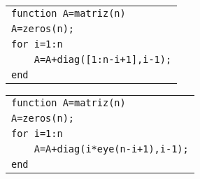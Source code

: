 \begin{pregunta}
\begin{multicols}{2}
\begin{alternativas}
{\begin{tabular}{|l|} \hline  \verb"function A=matriz(n)"\\ \verb"A=zeros(n);"\\ \verb"for i=1:n"\\ \verb"    A=A+diag([1:n-i+1],i-1);"\\ \verb"end"\\ \hline \end{tabular}} 
{\begin{tabular}{|l|} \hline \verb"function A=matriz(n)"\\ \verb"A=zeros(n);"\\ \verb"for i=1:n"\\ \verb"    A=A+diag(i*eye(n-i+1),i-1);"\\ \verb"end" \\ \hline \end{tabular}}
\end{alternativas}
\end{multicols}
\justificacion{0cm}
\end{pregunta}